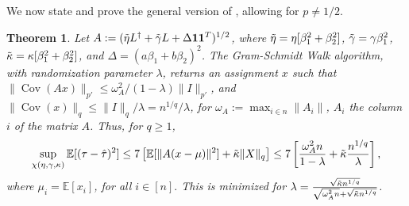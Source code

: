 \documentclass[12pt]{article}
\newtheorem{theorem}{Theorem}
\theoremstyle{definition}
\numberwithin{equation}{section}
\numberwithin{figure}{section}
\numberwithin{equation}{section}
\numberwithin{figure}{section}
\begin{document}
We now state and prove the general version of , allowing for $p \neq 1/2$.
\begin{theorem} \label{thm:gsw_nonsym}
Let $A:=(\Tilde{\eta}L^{\dagger} +\Tilde{\gamma} L + \Delta \mathbf{1} \mathbf{1}^T)^{1/2}$, where $\Tilde{\eta} = \eta[\beta_1^2 + \beta_2^2]$, $\Tilde{\gamma} = \gamma \beta_1^2$, $\Tilde{\kappa} =\kappa[\beta_1^2 + \beta_2^2]$, and $\Delta = (a \beta_1 + b \beta_2)^2$.
The Gram-Schmidt Walk algorithm, with randomization parameter $\lambda$, returns an assignment $x$ such that $\|\operatorname{Cov}(Ax)\|_{{p'}} \leq \omega_A^2/(1-\lambda)\|I \|_{{p'}}$, and $\|\operatorname{Cov}(x)\|_{q}\leq \|I\|_{q}/\lambda=n^{1/q}/\lambda$, for $\omega_A := \max_{i\in n} \|A_i\|$, $A_i$ the column $i$ of the matrix $A$. Thus, for $q \geq 1$,
\[
\sup_{\chi(\eta, \gamma, \kappa)} \mathbb{E}[(\tau - \hat{\tau})^2] \leq 7 \left[\mathbb{E}[\|A(x-\mu)\|^2] + \Tilde{\kappa}\|X\|_{q} \right] \leq 7 \left[\frac{\omega_A^2 n}{1-\lambda} + \Tilde{\kappa}\frac{n^{1/q}}{\lambda}\right],
\] where $\mu_i = \mathbb{E}[x_i]$, for all $i \in [n].$
This is minimized for $\lambda = \frac{\sqrt{\Tilde{\kappa} n^{1/q}}}{ \sqrt{\omega_A^2n} + \sqrt{\Tilde{\kappa}n^{1/q}}}$. 
\end{theorem}
\end{document}

